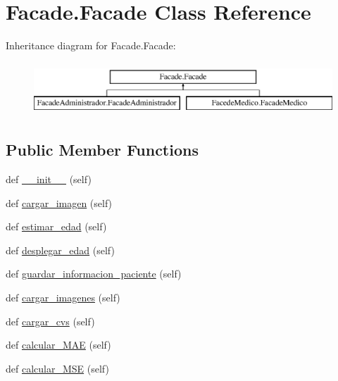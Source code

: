 \hypertarget{class_facade_1_1_facade}{}\section{Facade.\+Facade Class Reference}
\label{class_facade_1_1_facade}
Inheritance diagram for Facade.\+Facade\+:\begin{figure}[H]
\begin{center}
\leavevmode
\includegraphics[height=2.000000cm]{class_facade_1_1_facade}
\end{center}
\end{figure}
\subsection*{Public Member Functions}
\begin{DoxyCompactItemize}
\item 
def \mbox{\hyperlink{class_facade_1_1_facade_ad3ab1700c8824f9711bb33c34187f2b4}{\+\_\+\+\_\+init\+\_\+\+\_\+}} (self)
\item 
def \mbox{\hyperlink{class_facade_1_1_facade_a04ad2739895ce3afb592870e79e90d1d}{cargar\+\_\+imagen}} (self)
\item 
def \mbox{\hyperlink{class_facade_1_1_facade_a31c82e317bb43cffa46140c2826a908b}{estimar\+\_\+edad}} (self)
\item 
def \mbox{\hyperlink{class_facade_1_1_facade_a92d3a050a1526997ed8d0c080c016b77}{desplegar\+\_\+edad}} (self)
\item 
def \mbox{\hyperlink{class_facade_1_1_facade_a2d6ce899835aaae1a3b6022444d7127a}{guardar\+\_\+informacion\+\_\+paciente}} (self)
\item 
def \mbox{\hyperlink{class_facade_1_1_facade_a04f3d8f489b9054d4d40ac2a60c1881e}{cargar\+\_\+imagenes}} (self)
\item 
def \mbox{\hyperlink{class_facade_1_1_facade_a85dbe0a181d1c4665004b284f13e3632}{cargar\+\_\+cvs}} (self)
\item 
def \mbox{\hyperlink{class_facade_1_1_facade_abb62f6ed9e166bc1041ad7a3c57c4d58}{calcular\+\_\+\+M\+AE}} (self)
\item 
def \mbox{\hyperlink{class_facade_1_1_facade_a37747590f3e1ade1250e56dd9c424d03}{calcular\+\_\+\+M\+SE}} (self)
\end{DoxyCompactItemize}
